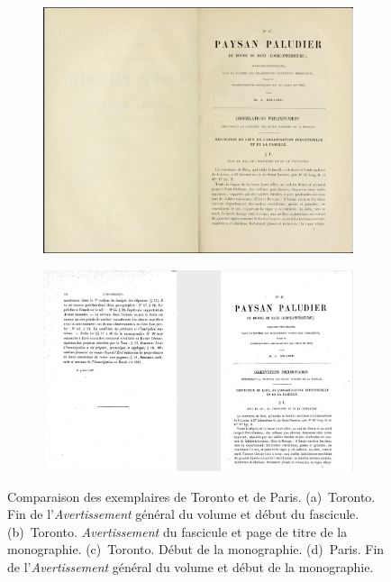 \begin{figure}[t]
    
    
    \begin{subfigure}[t]{0.4\textwidth}
     \includegraphics[width=1\linewidth]{img/odm47_ia_3.png}
     \caption{}
     \label{odm47ia3}
    \end{subfigure}
    \hspace{5pt}
    \begin{subfigure}[t]{0.4\textwidth}
     \includegraphics[width=1\linewidth]{img/odm47_bnf_1.png}
     \caption{}
     \label{odm47bnf}
    \end{subfigure}
    \caption[Comparaison des exemplaires de Toronto et de Paris]{Comparaison des exemplaires de Toronto et de Paris. (a)~Toronto. Fin de l'\textit{Avertissement} général du volume et début du fascicule. (b)~Toronto. \textit{Avertissement} du fascicule et page de titre de la monographie. (c)~Toronto. Début de la monographie. (d)~Paris. Fin de l'\textit{Avertissement} général du volume et début de la monographie.}
    \label{odm47}
\end{figure}

